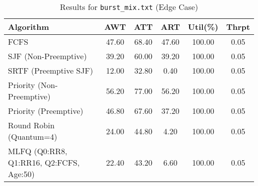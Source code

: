 \documentclass[12pt]{article}
\begin{document}
\begin{table}[htbp]
\centering
\caption{Results for \texttt{burst\_mix.txt} (Edge Case)}
\label{tab:burstmix_results}
\footnotesize
\begin{tabular}{@{}l S[table-format=3.2] S[table-format=3.2] S[table-format=3.2] S[table-format=3.2] S[table-format=1.2]@{}}
\toprule
Algorithm                                     & {AWT} & {ATT} & {ART} & {Util(\%)} & {Thrpt}\\
\midrule
FCFS                                         & 47.60         & 68.40            & 47.60          & 100.00          & 0.05 \\
SJF (Non-Preemptive)                         & 39.20         & 60.00            & 39.20          & 100.00          & 0.05 \\
SRTF (Preemptive SJF)                        & 12.00         & 32.80            & 0.40           & 100.00          & 0.05 \\
Priority (Non-Preemptive)                    & 56.20         & 77.00            & 56.20          & 100.00          & 0.05 \\
Priority (Preemptive)                        & 46.80         & 67.60            & 37.20          & 100.00          & 0.05 \\
Round Robin (Quantum=4)                      & 24.00         & 44.80            & 4.20           & 100.00          & 0.05 \\
MLFQ (Q0:RR8, Q1:RR16, Q2:FCFS, Age:50)      & 22.40         & 43.20            & 6.60           & 100.00          & 0.05 \\
\bottomrule
\end{tabular}
\end{table}
\end{document}

